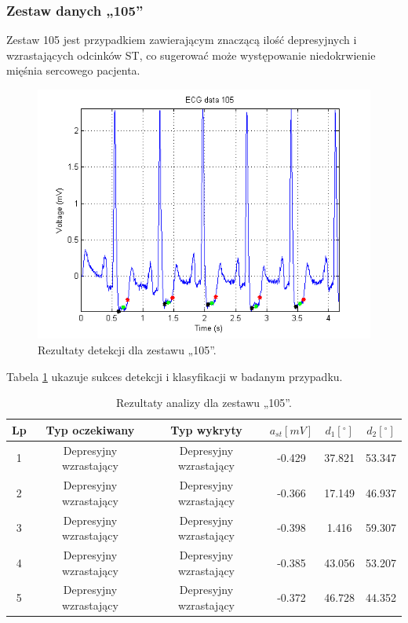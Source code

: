 \subsubsection*{Zestaw danych „105”}
Zestaw 105 jest przypadkiem zawierającym znaczącą ilość depresyjnych i wzrastających odcinków ST, co sugerować może występowanie niedokrwienie mięśnia sercowego pacjenta.
\begin{figure}[H]
	\centering
	\includegraphics[width=1\textwidth]{ST_INTERVAL/img/ST_zestaw105.png}
	\caption{Rezultaty detekcji dla zestawu „105”.}
	\label{fig:ST_zestaw105}
\end{figure}
Tabela \ref{tab:ST_zestaw105} ukazuje sukces detekcji i klasyfikacji w badanym przypadku.
\begin{table}[H]
	\centering
	\caption{Rezultaty analizy dla zestawu „105”.}
	\label{tab:ST_zestaw105}
	\begin{tabular}{|c|c|c|c|c|c|}
	\hline
	Lp & Typ oczekiwany & Typ wykryty & $ a_{st} [mV] $ & $ d_1 [^\circ] $ & $ d_2 [^\circ] $ \\ \hline
	1	&	Depresyjny wzrastający	&	Depresyjny wzrastający	&	-0.429	&	37.821	&	53.347 \\ \hline
	2	&	Depresyjny wzrastający	&	Depresyjny wzrastający	&	-0.366	&	17.149	&	46.937 \\ \hline
	3	&	Depresyjny wzrastający	&	Depresyjny wzrastający	&	-0.398	&	1.416	&	59.307 \\ \hline
	4	&	Depresyjny wzrastający	&	Depresyjny wzrastający	&	-0.385	&	43.056	&	53.207 \\ \hline
	5	&	Depresyjny wzrastający	&	Depresyjny wzrastający	&	-0.372	&	46.728	&	44.352 \\ \hline
	\end{tabular}
\end{table}

